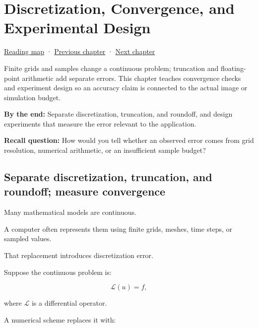 \chapter{Discretization, Convergence, and Experimental Design}\label{02-foundations-ii-ch029-discretization-convergence-and-experimental-design}\hypertarget{02-foundations-ii-ch029}{}\label{stagechapter:02-foundations-ii-ch029}

\hypertarget{02-foundations-ii-ch029-discretization-convergence-and-experimental-design}{}

\hyperref[volume-reading-map]{Reading map} · \hyperref[02-foundations-ii-ch028-reliable-optimization-and-root-finding]{Previous chapter} · \hyperref[02-foundations-ii-ch030-monte-carlo-estimates-and-uncertainty-metrics]{Next chapter}

Finite grids and samples change a continuous problem; truncation and floating-point arithmetic add separate errors. This chapter teaches convergence checks and experiment design so an accuracy claim is connected to the actual image or simulation budget.

\textbf{By the end:} Separate discretization, truncation, and roundoff, and design experiments that measure the error relevant to the application.

\textbf{Recall question:} How would you tell whether an observed error comes from grid resolution, numerical arithmetic, or an insufficient sample budget?

\section{Separate discretization, truncation, and roundoff; measure convergence}\label{02-foundations-ii-ch029-separate-discretization-truncation-and-roundoff-measure-convergence}

\hypertarget{02-foundations-ii-ch029-separate-discretization-truncation-and-roundoff-measure-convergence}{}

Many mathematical models are continuous.

A computer often represents them using finite grids, meshes, time steps, or sampled values.

That replacement introduces discretization error.

Suppose the continuous problem is:

\[ \mathcal L(u)=f, \]

where \(\mathcal L\) is a differential operator.

A numerical scheme replaces it with:

